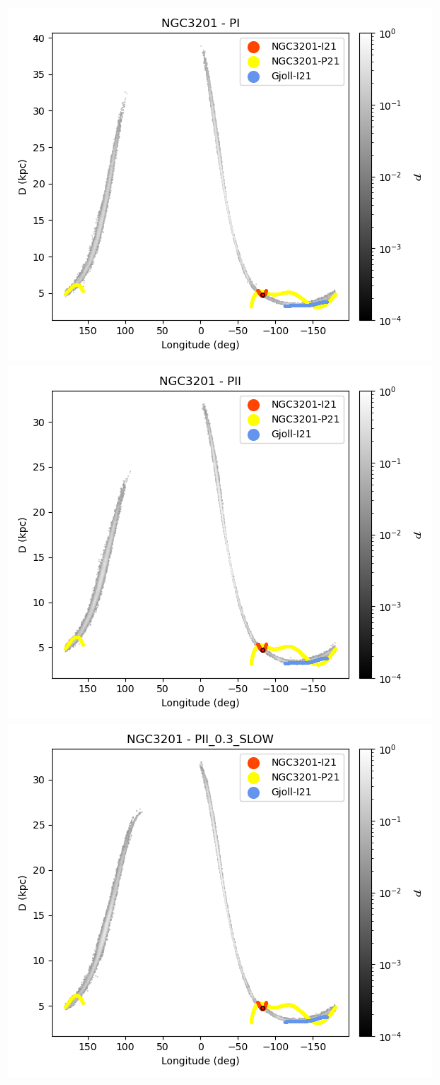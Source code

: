 \begin{figure}[h!]
\begin{center}
                    \includegraphics[clip=true, trim = 0mm 0mm 0mm 0mm, width=0.65\columnwidth]{images/PI_individual_NGC3201_galstream-NGC3201-l-distance.png}
                    \includegraphics[clip=true, trim = 0mm 0mm 0mm 0mm, width=0.65\columnwidth]{images/PII_individual_NGC3201_galstream-NGC3201-l-distance.png}
                    \includegraphics[clip=true, trim = 0mm 0mm 0mm 0mm, width=0.65\columnwidth]{images/PII_0.3_SLOW_individual_NGC3201_galstream-NGC3201-l-distance.png}
                \end{center}

\end{figure}
